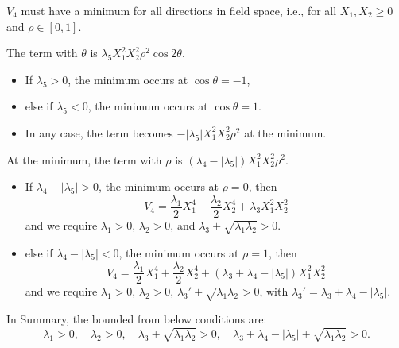 \documentclass{../bredelebeamer}
\begin{document}
\begin{frame}%
    $V_4$ must have a minimum for all directions in field space, i.e., for all $X_1, X_2 \geq 0$ and $\rho \in [0,1]$.
    \vfill
    
    The term with $\theta$ is $ \lambda_5 X_1^2 X_2^2 \rho^2 \cos 2\theta$. 
    \begin{itemize}
        \item If $\lambda_5 > 0$, the minimum occurs at $\cos\theta = -1$, 
        \item else if $\lambda_5 < 0$, the minimum occurs at $\cos\theta = 1$.
        \item In any case, the term becomes $-|\lambda_5| X_1^2 X_2^2 \rho^2$ at the minimum.
    \end{itemize}

    \pause
    At the minimum, the term with $\rho$ is $\left(\lambda_4 - |\lambda_5|\right) X_1^2 X_2^2 \rho^2$. 
    \begin{itemize}
        \item If $\lambda_4 - |\lambda_5| > 0$, the minimum occurs at $\rho = 0$, then
        \begin{equation}
            V_4 = \frac{\lambda_1}{2} X_1^4 + \frac{\lambda_2}{2} X_2^4 
            + \lambda_3 X_1^2 X_2^2
        \end{equation}
        and we require $\lambda_1 > 0$, $\lambda_2 > 0$, and $\lambda_3 + \sqrt{\lambda_1 \lambda_2} > 0$. \pause
        \item else if $\lambda_4 - |\lambda_5| < 0$, the minimum occurs at $\rho = 1$, then
        \begin{equation}
            V_4 = \frac{\lambda_1}{2} X_1^4 + \frac{\lambda_2}{2} X_2^4 
            + \left(\lambda_3 + \lambda_4 - |\lambda_5|\right) X_1^2 X_2^2
        \end{equation}
        and we require $\lambda_1 > 0$, $\lambda_2 > 0$, $\lambda_3' + \sqrt{\lambda_1 \lambda_2} > 0$, with $\lambda_3' = \lambda_3 + \lambda_4 - |\lambda_5|$.
    \end{itemize}
    
    

    \vfill
    In Summary, the bounded from below conditions are:
    $$\boxed{
    \lambda_1 > 0, \quad \lambda_2 > 0, \quad
    \lambda_3 + \sqrt{\lambda_1\lambda_2} > 0, \quad
    \lambda_3 + \lambda_4 - |\lambda_5| + \sqrt{\lambda_1\lambda_2} > 0.
    }
    $$
\end{frame}
\end{document}
